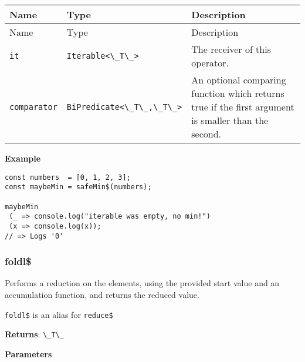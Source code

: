 \begin{longtable}[]{
  >{\raggedright\arraybackslash}p{}
  >{\raggedright\arraybackslash}p{}
  >{\raggedright\arraybackslash}p{}@{}}

\toprule\noalign{}
Name & Type & Description \\
\midrule\noalign{}
\endfirsthead
\toprule\noalign{}
Name & Type & Description \\
\midrule\noalign{}
\endhead
\bottomrule\noalign{}
\endlastfoot
\passthrough{\lstinline!it!} & \passthrough{\lstinline!Iterable<\_T\_>!}
& The receiver of this operator. \\
\passthrough{\lstinline!comparator!} &
\passthrough{\lstinline!BiPredicate<\_T\_,\_T\_>!} & An optional
comparing function which returns true if the first argument is smaller
than the second. \\
\end{longtable}

\textbf{Example}

\begin{lstlisting}[label=fa712c67-7a58-4fdf-a963-b5c88f702251]
const numbers  = [0, 1, 2, 3];
const maybeMin = safeMin$(numbers);
                                                 
maybeMin
 (_ => console.log("iterable was empty, no min!")
 (x => console.log(x));
// => Logs '0'
\end{lstlisting}

\hypertarget{8e9a31f3-adef-4efe-b6bd-884d685ebc44}{%
\subsubsection{foldl\$}\label{8e9a31f3-adef-4efe-b6bd-884d685ebc44}}

Performs a reduction on the elements, using the provided start value and
an accumulation function, and returns the reduced value.

\passthrough{\lstinline!foldl$!} is an alias for
\passthrough{\lstinline!reduce$!}

\textbf{Returns}: \passthrough{\lstinline!\_T\_!}

\textbf{Parameters}

